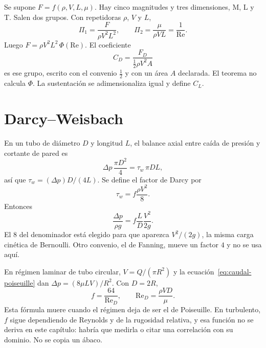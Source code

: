 \begin{examplebox}[Resistencia]
Se supone \(F=f(\rho,V,L,\mu)\). Hay cinco magnitudes y tres dimensiones, M, L y T. Salen dos grupos. Con repetidoras \(\rho\), \(V\) y \(L\),
\[
\Pi_1=\frac{F}{\rho V^2 L^2},
\qquad
\Pi_2=\frac{\mu}{\rho V L}=\frac{1}{\mathrm{Re}}.
\]
Luego \(F=\rho V^2 L^2\,\Phi(\mathrm{Re})\). El coeficiente
\begin{equation}
\label{eq:cd}
C_D=\frac{F_D}{\tfrac12\rho V^2 A}
\end{equation}
es ese grupo, escrito con el convenio \(\tfrac12\) y con un área \(A\) declarada. El teorema no calcula \(\Phi\). La sustentación se adimensionaliza igual y define \(C_L\).
\end{examplebox}

\section{Darcy--Weisbach}

En un tubo de diámetro \(D\) y longitud \(L\), el balance axial entre caída de presión y cortante de pared es
\[
\Delta p\,\frac{\pi D^2}{4}=\tau_w\,\pi D L,
\]
así que \(\tau_w=(\Delta p) D/(4L)\). Se define el factor de Darcy por
\begin{equation}
\label{eq:darcy-def}
\tau_w=f\frac{\rho V^2}{8}.
\end{equation}
Entonces
\begin{equation}
\label{eq:darcy}
\frac{\Delta p}{\rho g}=f\frac{L}{D}\frac{V^2}{2g}.
\end{equation}
 El \(8\) del denominador está elegido para que aparezca \(V^2/(2g)\), la misma carga cinética de Bernoulli. Otro convenio, el de Fanning, mueve un factor \(4\) y no se usa aquí.

En régimen laminar de tubo circular, \(V=Q/(\pi R^2)\) y la ecuación~\eqref{eq:caudal-poiseuille} dan \(\Delta p=(8\mu L V)/R^2\). Con \(D=2R\),
\[
f=\frac{64}{\mathrm{Re}_D},
\qquad
\mathrm{Re}_D=\frac{\rho V D}{\mu}.
\]
Esta fórmula muere cuando el régimen deja de ser el de Poiseuille. En turbulento, \(f\) sigue dependiendo de Reynolds y de la rugosidad relativa, y esa función no se deriva en este capítulo: habría que medirla o citar una correlación con su dominio. No se copia un ábaco.

